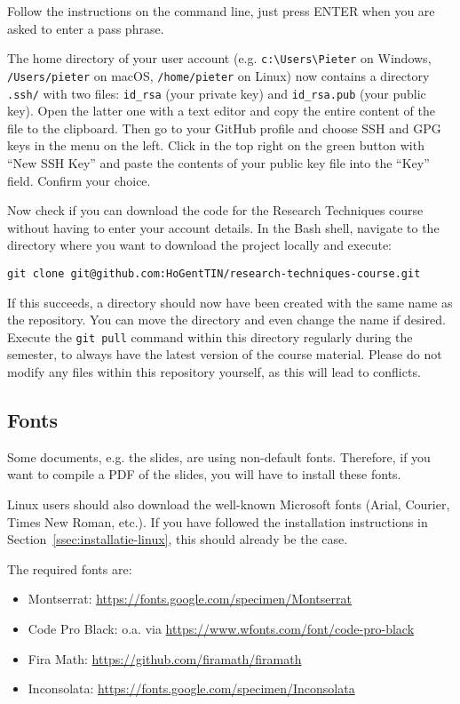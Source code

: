 Follow the instructions on the command line, just press ENTER when you are asked to enter a pass phrase.

The home directory of your user account (e.g. \verb|c:\Users\Pieter| on Windows, \verb|/Users/pieter| on macOS, \verb|/home/pieter| on Linux) now contains a directory \verb|.ssh/| with two files:  \verb|id_rsa| (your private key) and \verb|id_rsa.pub| (your public key).
Open the latter one with a text editor and copy the entire content of the file to the clipboard. Then go to your GitHub profile and choose SSH and GPG keys in the menu on the left. Click in the top right on the green button with ``New SSH Key'' and paste the contents of your public key file into the ``Key'' field. Confirm your choice.

Now check if you can download the code for the Research Techniques course without having to enter your account details. 
In the Bash shell, navigate to the directory where you want to download the project locally and execute:

\begin{verbatim}
git clone git@github.com:HoGentTIN/research-techniques-course.git 
\end{verbatim}

If this succeeds, a directory should now have been created with the same name as the repository. You can move the directory and even change the name if desired. Execute the \texttt{git pull} command within this directory regularly during the semester, to always have the latest version of the course material. Please do not modify any files within this repository yourself, as this will lead to conflicts.

\subsection{Fonts}

Some documents, e.g. the slides, are using non-default fonts. Therefore, if you want to compile a PDF of the slides, you will have to install these fonts.

Linux users should also download the well-known Microsoft fonts (Arial, Courier, Times New Roman, etc.). If you have followed the installation instructions in Section~\ref{ssec:installatie-linux}, this should already be the case.

The required fonts are:

\begin{itemize}
    \item Montserrat: \url{https://fonts.google.com/specimen/Montserrat}
    \item Code Pro Black: o.a. via \url{https://www.wfonts.com/font/code-pro-black}
    \item Fira Math: \url{https://github.com/firamath/firamath}
    \item Inconsolata: \url{https://fonts.google.com/specimen/Inconsolata}
\end{itemize}

